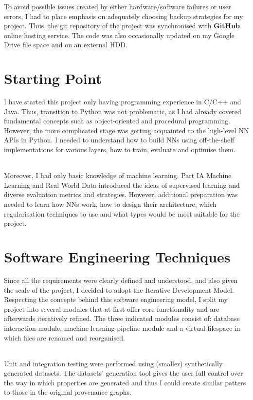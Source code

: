 To avoid possible issues created by either hardware/software failures or user errors, I had to place emphasis on adequately choosing backup strategies for my project. Thus, the git repository of the project was synchronised with \textbf{GitHub} online hosting service. The code was also occasionally updated on my Google Drive file space and on an external HDD. \\

\section{Starting Point}

I have started this project only having programming experience in C/C++ and Java. Thus, transition to Python was not problematic, as I had already covered fundamental concepts such as object-oriented and procedural programming. However, the more complicated stage was getting acquainted to the high-level NN APIs in Python. I needed to understand how to build NNs using off-the-shelf implementations for various layers, how to train, evaluate and optimise them. \\\

Moreover, I had only basic knowledge of machine learning. Part IA Machine Learning and Real World Data introduced the ideas of supervised learning and diverse evaluation metrics and strategies. However, additional preparation was needed to learn how NNs work, how to design their architecture, which regularisation techniques to use and what types would be most suitable for the project. \\

\section{Software Engineering Techniques}

Since all the requirements were clearly defined and understood, and also given the scale of the project, I decided to adopt the Iterative Development Model. Respecting the concepts behind this software engineering model, I split my project into several modules that at first offer core functionality and are afterwards iteratively refined. The three indicated modules
consist of: database interaction module, machine learning pipeline module and a virtual filespace in which files are renamed and reorganised. \\\

Unit and integration testing were performed using (smaller) synthetically generated datasets. The datasets' generation tool gives the user full control over the way in which properties are generated and thus I could create similar patters to those in the original provenance graphs. \\

